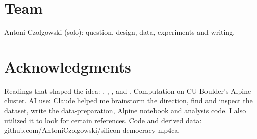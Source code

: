 \documentclass[10pt,twocolumn]{article}
\begin{document}
\section*{Team}
Antoni Czolgowski (solo): question, design, data, experiments and writing.

\section*{Acknowledgments}
Readings that shaped the idea: \citet{hamilton2026}, \citet{abdulhai2026}, \citet{subbiah2026}, \citet{zhou2025} and \citet{bamman2024}. Computation on CU Boulder's Alpine cluster. AI use: Claude helped me brainstorm the direction, find and inspect the dataset, write the data-preparation, Alpine notebook and analysis code. I also utilized it to look for certain references. Code and derived data: github.com/AntoniCzolgowski/silicon-democracy-nlp4ca.
\end{document}
